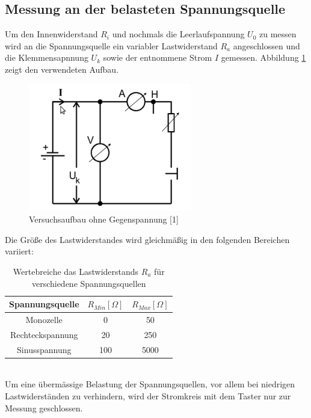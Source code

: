 \documentclass[11pt,ngerman,a4paper]{article}
\begin{document}
\subsection{Messung an der belasteten Spannungsquelle}
Um den Innenwiderstand $R_i$ und nochmals die Leerlaufspannung $U_0$ zu messen wird an die Spannungsquelle ein variabler Lastwiderstand $R_a$ angeschlossen und die Klemmensapnnung $U_k$ sowie der entnommene Strom $I$ gemessen. Abbildung \ref{Aufbau1} zeigt den verwendeten Aufbau. 
\begin{figure}[htp]
\centering
\includegraphics[scale=1.00]{abb1.png}
\caption{Versuchsaufbau ohne Gegenspannung [1]}
\label{Aufbau1}
\end{figure}
Die Gr\"o\ss e des Lastwiderstandes wird gleichm\"a\ss ig in den folgenden Bereichen variiert:
\begin{table}[h!]
\centering
\begin{tabular}{|c|c|c|}
\hline
Spannungsquelle& $R_{Min} [\Omega]$& $R_{Max} [\Omega]$\\
\hline
Monozelle & 0& 50\\
Rechteckspannung &  20 & 250\\
Sinusspannung&100& 5000\\
\hline
\end{tabular}

\caption{Wertebreiche das Lastwiderstands $R_a$ f\"ur verschiedene Spannungsquellen}
\end{table}\\
Um eine \"uberm\"assige Belastung der Spannungsquellen, vor allem bei niedrigen Lastwiderst\"anden zu verhindern, wird der Stromkreis mit dem Taster nur zur Messung geschlossen.
\end{document}

